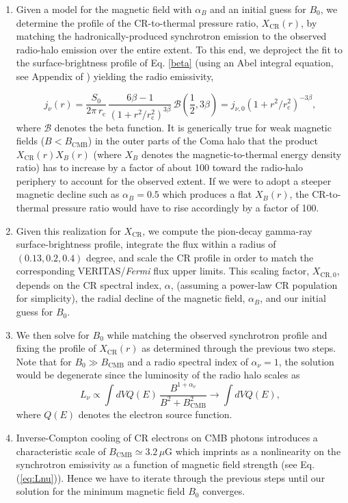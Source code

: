\documentclass[12pt,manuscript]{aastex}
\def\Fermi{{\em Fermi}\xspace}
\newcommand{\rmn}{\mathrm}
\newcommand{\CR}{\mathrm{CR}}
\begin{document}
\begin{enumerate}
\item
Given a model for the magnetic field with $\alpha_B$ and an initial guess for $B_0$, we determine
the profile of the CR-to-thermal pressure ratio, $X_{\CR}(r)$, by matching the hadronically-produced
synchrotron emission to the observed radio-halo emission over the entire extent. To 
this end, we deproject the fit to the surface-brightness profile of Eq. \ref{beta} (using an Abel
integral equation, see Appendix of \citealt{article:PfrommerEnsslin:2004b}) yielding the radio
emissivity,

\begin{equation}
\label{eq:Coma:radio}
j_{\nu} (r) = \frac{S_{0}}{2\pi\, r_{\rmn{c}}}\,
\frac{6\beta - 1}{\left(1 + r^{2}/r_{\rmn{c}}^{2}\right)^{3 \beta}}\,
\mathcal{B}\left(\frac{1}{2}, 3\beta\right)
= j_{\nu,0} \left(1 + r^2/r_{\rmn{c}}^{2}\right)^{-3 \beta},
\end{equation}
where $\mathcal{B}$ denotes the beta function. It is generically true for weak magnetic fields
($B<B_{\rmn{CMB}}$) in the outer parts of the Coma halo that the product $X_{\CR}(r)X_{B}(r)$ (where
$X_B$ denotes the magnetic-to-thermal energy density ratio) has to increase by a factor of about 100
toward the radio-halo periphery to account for the observed extent. If we were to adopt a steeper
magnetic decline such as $\alpha_{B}=0.5$ which produces a flat $X_{B}(r)$, the CR-to-thermal
pressure ratio would have to rise accordingly by a factor of 100.

\item
Given this realization for $X_{\CR}$, we compute the pion-decay gamma-ray surface-brightness
profile, integrate the flux within a radius of $(0.13, 0.2, 0.4)$ degree, and scale the CR profile
in order to match the corresponding VERITAS/\Fermi flux upper limits. This scaling factor,
$X_{\CR,0}$, depends on the CR spectral index, $\alpha$, (assuming a power-law CR population for
simplicity), the radial decline of the magnetic field, $\alpha_{B}$, and our initial guess for
$B_{0}$.

\item
We then solve for $B_{0}$ while matching the observed synchrotron profile and fixing the profile
of $X_{\CR}(r)$ as determined through the previous two steps. Note
that for $B_{0} \gg B_{\rmn{CMB}}$ and a radio spectral index of $\alpha_{\nu}=1$, the solution
would be degenerate since the luminosity of the radio halo scales as
\begin{equation}
\label{eq:Lnu}
L_{\nu} \propto \int dV Q(E)\,\frac{B^{1+\alpha_\nu}}{B^2 + B_{\rmn{CMB}}^2} \to \int dV Q(E),
\end{equation}
where $Q(E)$ denotes the electron source function.

\item Inverse-Compton cooling of CR electrons on CMB photons introduces a characteristic scale of
  $B_{\rmn{CMB}}\simeq 3.2\,\mu$G which imprints as a nonlinearity on the synchrotron emissivity as
  a function of magnetic field strength (see Eq. (\ref{eq:Lnu})). Hence we have to iterate through
  the previous steps until our solution for the minimum magnetic field $B_{0}$ converges.
\end{enumerate}
\end{document}
